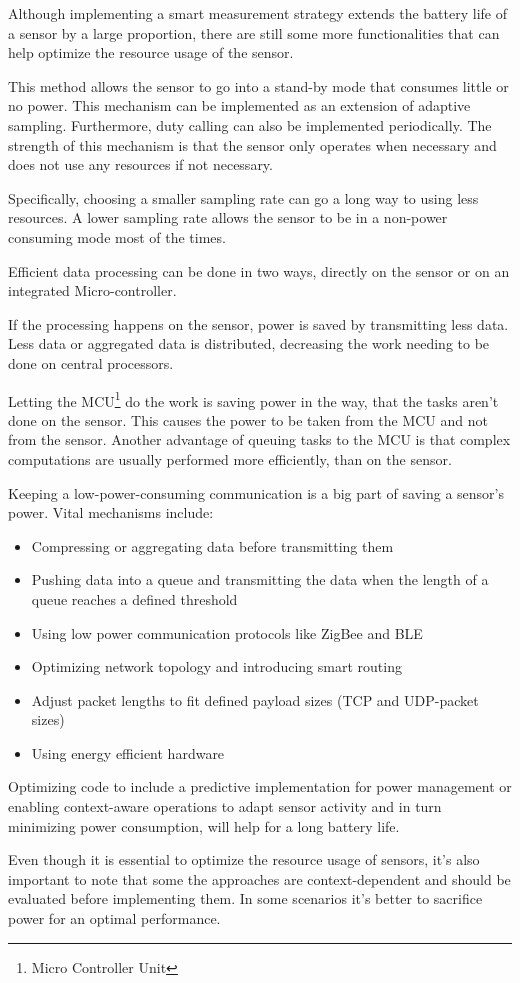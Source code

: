 Although implementing a smart measurement strategy extends the battery life of a sensor by a large proportion, there are still some more functionalities that can help optimize the resource usage of the sensor.

This method allows the sensor to go into a stand-by mode that consumes little or no power. This mechanism can be implemented as an extension of adaptive sampling. Furthermore, duty calling can also be implemented periodically. The strength of this mechanism is that the sensor only operates when necessary and does not use any resources if not necessary.

Specifically, choosing a smaller sampling rate can go a long way to using less resources. A lower sampling rate allows the sensor to be in a non-power consuming mode most of the times. 

Efficient data processing can be done in two ways, directly on the sensor or on an integrated Micro-controller. 

If the processing happens on the sensor, power is saved by transmitting less data. Less data or aggregated data is distributed, decreasing the work needing to be done on central processors.

Letting the MCU\footnote{Micro Controller Unit} do the work is saving power in the way, that the tasks aren't done on the sensor. This causes the power to be taken from the MCU and not from the sensor. Another advantage of queuing tasks to the MCU is that complex computations are usually performed more efficiently, than on the sensor. 

Keeping a low-power-consuming communication is a big part of saving a sensor's power. Vital mechanisms include:

\begin{itemize}
    \item Compressing or aggregating data before transmitting them
    \item Pushing data into a queue and transmitting the data when the length of a queue reaches a defined threshold
    \item Using low power communication protocols like ZigBee and BLE
    \item Optimizing network topology and introducing smart routing
    \item Adjust packet lengths to fit defined payload sizes (TCP and UDP-packet sizes)
    \item Using energy efficient hardware
\end{itemize}

Optimizing code to include a predictive implementation for power management or enabling context-aware operations to adapt sensor activity and in turn minimizing power consumption, will help for a long battery life.

Even though it is essential to optimize the resource usage of sensors, it's also important to note that some the approaches are context-dependent and should be evaluated before implementing them. In some scenarios it's better to sacrifice power for an optimal performance. 

\noindent\cite{LRWeb:61}